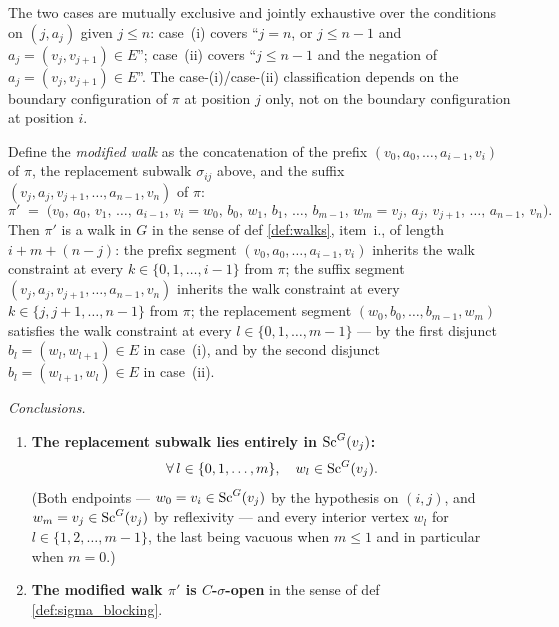 \begin{Lem}[LabelRoman]
    The two cases are mutually exclusive and jointly exhaustive over the conditions on $(j, a_j)$ given $j \le n$: case~(i) covers ``$j = n$, or $j \le n - 1$ and $a_j = (v_j, v_{j+1}) \in E$''; case~(ii) covers ``$j \le n - 1$ and the negation of $a_j = (v_j, v_{j+1}) \in E$''. The case-(i)/case-(ii) classification depends on the boundary configuration of $\pi$ at position $j$ only, not on the boundary configuration at position $i$.

    Define the \emph{modified walk} as the concatenation of the prefix $(v_0, a_0, \dots, a_{i-1}, v_i)$ of $\pi$, the replacement subwalk $\sigma_{ij}$ above, and the suffix $(v_j, a_j, v_{j+1}, \dots, a_{n-1}, v_n)$ of $\pi$:
    \[
        \pi' \;=\; \bigl(v_0, \, a_0, \, v_1, \, \dots, \, a_{i-1}, \, v_i = w_0, \, b_0, \, w_1, \, b_1, \, \dots, \, b_{m-1}, \, w_m = v_j, \, a_j, \, v_{j+1}, \, \dots, \, a_{n-1}, \, v_n\bigr).
    \]
    Then $\pi'$ is a walk in $G$ in the sense of def \ref{def:walks}, item~i., of length $i + m + (n - j)$: the prefix segment $(v_0, a_0, \dots, a_{i-1}, v_i)$ inherits the walk constraint at every $k \in \{0, 1, \dots, i - 1\}$ from $\pi$; the suffix segment $(v_j, a_j, v_{j+1}, \dots, a_{n-1}, v_n)$ inherits the walk constraint at every $k \in \{j, j + 1, \dots, n - 1\}$ from $\pi$; the replacement segment $(w_0, b_0, \dots, b_{m-1}, w_m)$ satisfies the walk constraint at every $l \in \{0, 1, \dots, m - 1\}$ — by the first disjunct $b_l = (w_l, w_{l+1}) \in E$ in case~(i), and by the second disjunct $b_l = (w_{l+1}, w_l) \in E$ in case~(ii).

    \emph{Conclusions.}
    \begin{enumerate}
        \item \textbf{The replacement subwalk lies entirely in $\mathrm{Sc}^G(v_j)$:}
            \[
                \forall\, l \in \{0, 1, \dots, m\}, \quad w_l \in \mathrm{Sc}^G(v_j).
            \]
            (Both endpoints — $w_0 = v_i \in \mathrm{Sc}^G(v_j)$ by the hypothesis on $(i, j)$, and $w_m = v_j \in \mathrm{Sc}^G(v_j)$ by reflexivity — and every interior vertex $w_l$ for $l \in \{1, 2, \dots, m - 1\}$, the last being vacuous when $m \le 1$ and in particular when $m = 0$.)
        \item \textbf{The modified walk $\pi'$ is $C$-$\sigma$-open} in the sense of def \ref{def:sigma_blocking}.
    \end{enumerate}


\end{Lem}
